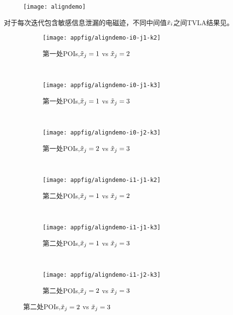 {{	\begin{figure}[!h]
		\begin{center}
			\texttt{[image: aligndemo]}
			\label{fig:aligndemo}
		\end{center}
	\end{figure}

	对于每次迭代包含敏感信息泄漏的电磁迹，不同中间值$\tilde{x}_i$之间TVLA结果见。
	
	\begin{figure}[!h]
		\centering
		\begin{subfigure}[b]{\trif\textwidth}
			\texttt{[image: appfig/aligndemo-i0-j1-k2]}
			\caption{第一处POIs,$\tilde{x}_j=1$ vs $\tilde{x}_j=2$}
			\label{fig:aligndemo012}
		\end{subfigure}%
		~%
		\begin{subfigure}[b]{\trif\textwidth}
			\texttt{[image: appfig/aligndemo-i0-j1-k3]}
			\caption{第一处POIs,$\tilde{x}_j=1$ vs $\tilde{x}_j=3$}
			\label{fig:aligndemo013}
		\end{subfigure}
		~%
		\begin{subfigure}[b]{\trif\textwidth}
			\texttt{[image: appfig/aligndemo-i0-j2-k3]}
			\caption{第一处POIs,$\tilde{x}_j=2$ vs $\tilde{x}_j=3$}
			\label{fig:aligndemo023}
		\end{subfigure}
		\\%
		\begin{subfigure}[b]{\trif\textwidth}
			\texttt{[image: appfig/aligndemo-i1-j1-k2]}
			\caption{第二处POIs,$\tilde{x}_j=1$ vs $\tilde{x}_j=2$}
			\label{fig:aligndemo112}
		\end{subfigure}%
		~%
		\begin{subfigure}[b]{\trif\textwidth}
			\texttt{[image: appfig/aligndemo-i1-j1-k3]}
			\caption{第二处POIs,$\tilde{x}_j=1$ vs $\tilde{x}_j=3$}
			\label{fig:aligndemo113}
		\end{subfigure}
		~%
		\begin{subfigure}[b]{\trif\textwidth}
			\texttt{[image: appfig/aligndemo-i1-j2-k3]}
			\caption{第二处POIs,$\tilde{x}_j=2$ vs $\tilde{x}_j=3$}
			\label{fig:aligndemo123}
		\end{subfigure}

\end{figure}}}
